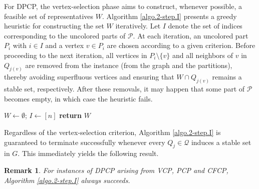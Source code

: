 \documentclass[preprint, 11pt, authoryear]{elsarticle}
\newtheorem{remark}{Remark}[section]
\newcommand{\PP}{{\mathcal P}}
\newcommand{\QQ}{{\mathcal Q}}
\begin{document}
For DPCP, the vertex-selection phase aims to construct, whenever possible, a feasible set of representatives $W$. 
Algorithm \ref{algo.2-step.I} presents a greedy heuristic for constructing the set $W$ iteratively.
Let $I$ denote the set of indices corresponding to the uncolored parts of $\PP$.
At each iteration, an uncolored part $P_i$ with $i \in I$ and a vertex $v \in P_i$ are chosen according to a given criterion.
Before proceeding to the next iteration, all vertices in $P_{i} \setminus \{v\}$ and all neighbors of $v$ in $Q_{j(v)}$ are removed from the instance (from the graph and the partitions), thereby avoiding superfluous vertices and ensuring that $W \cap Q_{j(v)}$ remains a stable set, respectively.
After these removals, it may happen that some part of $\PP$ becomes empty, in which case the heuristic fails.

\begin{algorithm}
\caption{greedy heuristic for the vertex-selection phase}
\label{algo.2-step.I}
\small
\KwData{$G=(V,E)$ and partitions $\PP$,$\QQ$ of $V$}
$W \gets \emptyset$; $I \gets [n]$\;
\textbf{return} $W$\;
\end{algorithm}

Regardless of the vertex-selection criterion, Algorithm \ref{algo.2-step.I} is guaranteed to terminate successfully whenever every $Q_j \in \QQ$ induces a stable set in $G$. 
This immediately yields the following result.

\begin{remark}\label{remark.2.step.heuristic.success}
For instances of DPCP arising from VCP, PCP and CFCP, Algorithm \ref{algo.2-step.I} always succeeds.
\end{remark}
\end{document}
